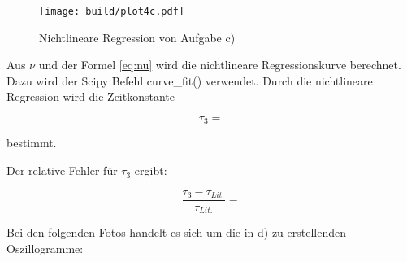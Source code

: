   \begin{figure}[H]
    \texttt{[image: build/plot4c.pdf]}
    \centering
    \caption{Nichtlineare Regression von Aufgabe c)}
    \label{fig:4c}
  \end{figure}

  Aus $\nu$ und der Formel \ref{eq:nu} wird die nichtlineare Regressionskurve berechnet. Dazu wird der Scipy Befehl curve\_fit() 
  \cite{scipy} verwendet. Durch die nichtlineare Regression wird die Zeitkonstante
 
  \begin{equation}
  \tau_3 = \text{}
  \end{equation}

  bestimmt.

  Der relative Fehler für $\tau_3$ ergibt:

  \begin{equation}
  \frac{\tau_3-\tau_{Lit.}}{\tau_{Lit.}}=\text{}
  \end{equation}

  \newpage
  Bei den folgenden Fotos handelt es sich um die in d) zu erstellenden Oszillogramme:

